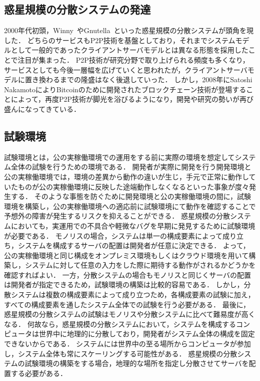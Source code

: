 \subsection{惑星規模の分散システムの発達}

2000年代初頭，Winny~\cite{Winny}やGnutella~\cite{Gnutella}といった惑星規模の分散システムが頭角を現した．
どちらのサービスもP2P技術を基盤としており，それまでシステムモデルとして一般的であったクライアントサーバモデルとは異なる形態を採用したことで注目が集まった．
P2P技術が研究分野で取り上げられる頻度も多くなり，サービスとしても今後一層幅を広げていくと思われたが，クライアントサーバモデルに置き換わるまでの隆盛はなく後退していった．
しかし，2008年にSatoshi NakamotoによりBitcoinのために開発されたブロックチェーン技術が登場することによって，再度P2P技術が脚光を浴びるようになり，開発や研究の勢いが再び盛んになってきている．

\subsection{試験環境}

試験環境とは，公の実稼働環境での運用をする前に実際の環境を想定してシステム全体の試験を行うための環境である．
開発者が実際に開発を行う開発環境と公の実稼働環境では，環境の差異から動作の違いが生じ，手元で正常に動作していたものが公の実稼働環境に反映した途端動作しなくなるといった事象が度々発生する．
そのような事態を防ぐために開発環境と公の実稼働環境の間に，試験環境を構築し，公の実稼働環境への適応前に試験環境にて動作を確認することで予想外の障害が発生するリスクを抑えることができる．
惑星規模の分散システムにおいても，実運用での不具合や軽微なバグを早期に発見するために試験環境が必要である．
モノリスの場合，システムは単一の構成要素によって成り立ち，システムを構成するサーバの配置は開発者が任意に決定できる．
よって，公の実稼働環境と同じ構成をオンプレミス環境もしくはクラウド環境を用いて構築し，システムに対して任意の入力をした際に期待する動作がされるかどうかを確認すればよい．
一方，分散システムの場合もモノリスと同じくサーバの配置は開発者が指定できるため，試験環境の構築は比較的容易である．
しかし，分散システムは複数の構成要素によって成り立つため，各構成要素の試験に加え，すべての構成要素を通したシステム全体での試験を行う必要がある．
最後に，惑星規模の分散システムの試験はモノリスや分散システムに比べて難易度が高くなる．
何故なら，惑星規模の分散システムにおいて，システムを構成するコンピュータは世界中に地理的に分散しており，開発者がシステム全体の構成を固定できないからである．
システムには世界中の至る場所からコンピュータが参加し，システム全体も常にスケーリングする可能性がある．
惑星規模の分散システムの試験環境の構築をする場合，地理的な場所を指定し分散させてサーバを配置する必要がある．


